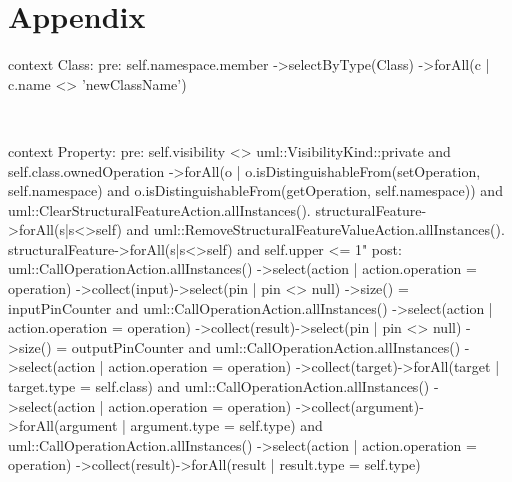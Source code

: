 \documentclass{llncs}
\begin{document}
\newpage



\newpage
\appendix
\section{Appendix}
\label{sec:appendix}

\begin{lstsingle}[language=OCL,caption=OCL for \textit{rename class} refactoring,label=lst:renameclass]
context Class:
pre:  self.namespace.member
      ->selectByType(Class)
      ->forAll(c | c.name <> 'newClassName')
\end{lstsingle}
\\
\begin{lstsingle}[language=OCL,caption=OCL for \textit{encapsulate property} refactoring,label=lst:encapsulate]
context Property:
pre:  self.visibility <> uml::VisibilityKind::private 
      and 
      self.class.ownedOperation
        ->forAll(o | o.isDistinguishableFrom(setOperation, 
            self.namespace)
          and 
          o.isDistinguishableFrom(getOperation, 
            self.namespace)) 
      and 
      uml::ClearStructuralFeatureAction.allInstances().
        structuralFeature->forAll(s|s<>self)
      and
      uml::RemoveStructuralFeatureValueAction.allInstances().
        structuralFeature->forAll(s|s<>self)
      and
      self.upper <= 1"
post: uml::CallOperationAction.allInstances()
        ->select(action | action.operation = operation)
        ->collect(input)->select(pin | pin <> null)
        ->size() = inputPinCounter
      and
      uml::CallOperationAction.allInstances()
        ->select(action | action.operation = operation)
        ->collect(result)->select(pin | pin <> null)
        ->size() = outputPinCounter
      and
      uml::CallOperationAction.allInstances()
        ->select(action | action.operation = operation)
        ->collect(target)->forAll(target | target.type 
        = self.class)
      and 
      uml::CallOperationAction.allInstances()
        ->select(action | action.operation = operation)
        ->collect(argument)->forAll(argument | argument.type 
        = self.type)
      and
      uml::CallOperationAction.allInstances()
        ->select(action | action.operation = operation)
        ->collect(result)->forAll(result | result.type 
        = self.type)
\end{lstsingle}
\end{document}
